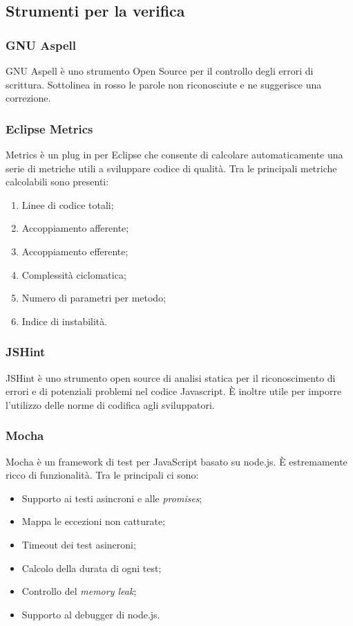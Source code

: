 \subsection{Strumenti per la verifica}

\subsubsection{GNU Aspell}
GNU Aspell è uno strumento Open Source per il controllo degli errori di scrittura. Sottolinea in rosso le parole non riconosciute e ne suggerisce una correzione.
\subsubsection{Eclipse Metrics}
Metrics è un plug in per Eclipse che consente di calcolare automaticamente una serie di metriche utili a sviluppare codice di qualità.
Tra le principali metriche calcolabili sono presenti:
\begin{enumerate}
\item Linee di codice totali;
\item Accoppiamento afferente;
\item Accoppiamento efferente;
\item Complessità ciclomatica;
\item Numero di parametri per metodo;
\item Indice di instabilità.
\end{enumerate}

\subsubsection{JSHint}
JSHint è uno strumento open source di analisi statica per il riconoscimento di errori e di potenziali problemi nel codice Javascript. \`{E} inoltre utile per imporre l'utilizzo delle norme di codifica agli sviluppatori.

\subsubsection{Mocha}
Mocha è un framework di test per  JavaScript basato su node.js. \`{E} estremamente ricco di funzionalità. Tra le principali ci sono:
\begin{itemize}
\item Supporto ai testi asincroni e alle \textit{promises};
\item Mappa le eccezioni non catturate;
\item Timeout dei test asincroni;
\item Calcolo della durata di ogni test;
\item Controllo del \textit{memory leak};
\item Supporto al debugger di node.js.
\end{itemize}

